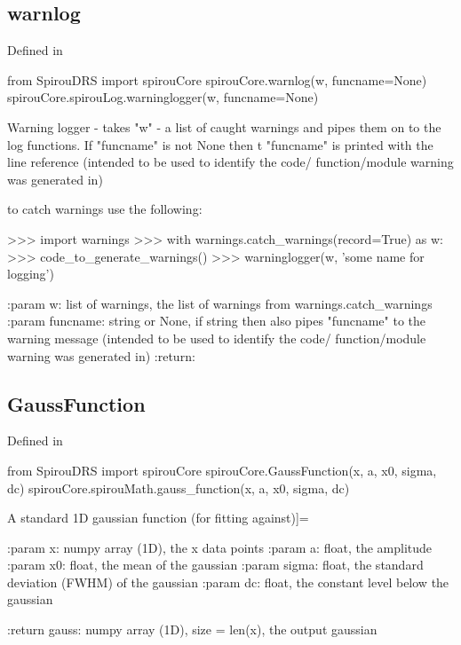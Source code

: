 \noindent\begin{minipage}{\textwidth}
\subsection{warnlog}

Defined in \spirouCore{}

\begin{pythonbox}
from SpirouDRS import spirouCore
spirouCore.warnlog(w, funcname=None)
spirouCore.spirouLog.warninglogger(w, funcname=None)
\end{pythonbox}

\begin{pythondocstring}
Warning logger - takes "w" - a list of caught warnings and pipes them on
to the log functions. If "funcname" is not None then t "funcname" is
printed with the line reference (intended to be used to identify the code/
function/module warning was generated in)

to catch warnings use the following:

>>> import warnings
>>> with warnings.catch_warnings(record=True) as w:
>>>     code_to_generate_warnings()
>>> warninglogger(w, 'some name for logging')

:param w: list of warnings, the list of warnings from
           warnings.catch_warnings
:param funcname: string or None, if string then also pipes "funcname" to the
                 warning message (intended to be used to identify the code/
                 function/module warning was generated in)
:return:
\end{pythondocstring}
\end{minipage}

\noindent\begin{minipage}{\textwidth}
\subsection{GaussFunction}

Defined in \spirouCore{}

\begin{pythonbox}
from SpirouDRS import spirouCore
spirouCore.GaussFunction(x, a, x0, sigma, dc)
spirouCore.spirouMath.gauss_function(x, a, x0, sigma, dc)
\end{pythonbox}

\begin{pythondocstring}
A standard 1D gaussian function (for fitting against)]=

:param x: numpy array (1D), the x data points
:param a: float, the amplitude
:param x0: float, the mean of the gaussian
:param sigma: float, the standard deviation (FWHM) of the gaussian
:param dc: float, the constant level below the gaussian

:return gauss: numpy array (1D), size = len(x), the output gaussian
\end{pythondocstring}
\end{minipage}

